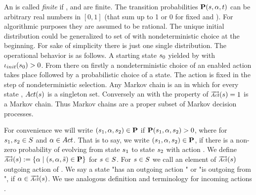 \documentclass[preview]{standalone}
\begin{document}
An \mdpN is called \emph{finite} if \states, \actions and \atomicprops are finite. The transition probabilities ${\textbf{P}}({s}, {\alpha}, t)$ can be arbitrary real numbers in $[0,1]$ (that sum up to 1 or 0 for fixed \state and \action). For algorithmic purposes they are assumed to be rational.  The unique initial distribution \initdistrib could be generalized to set of \initdistrib with nondeterministic choice at the beginning. For sake of simplicity there is just one single distribution. The operational behavior is as follows. A starting state ${s}_0$ yielded by \initdistrib with ${\iota_{init}}({s}_0) > 0$. From there on firstly a nondeterministic choice of an enabled action takes place followed by a probabilistic choice of a state. The action is fixed in the step of nondeterministic selection. Any Markov chain is an \mdpN in which for every state \state, ${Act}({s})$ is a singleton set. Conversely an \mdpN with the property of $\outacts(\state) = 1$ is a Markov chain. Thus Markov chains are a proper subset of Markov decision processes.

For convenience we will write $({s}_1, {\alpha}, {s}_2) \in {\textbf{P}}$ if ${\textbf{P}}({s}_1, {\alpha}, {s}_2) > 0$, where for ${s}_1, {s}_2 \in {S}$ and ${\alpha} \in {Act}$. That is to say, we write $({s}_1, {\alpha}, {s}_2) \in {\textbf{P}}$, if there is a non-zero probability of evolving from state ${s}_1$ to state ${s}_2$ with action \action.
We define $\outacts(\state) := \{\action \mid (\state,\action,\smstate) \in \trans\}$ for ${s} \in {S}$. For ${s} \in {S}$ we call an element of $\outacts(\state)$ outgoing action of \state. We say a state \state "has an outgoing action \action" or "\action is outgoing from \state", if $\action \in \outacts(\state)$. We use analogous definition and terminology for incoming actions \inacts. 
\end{document}
